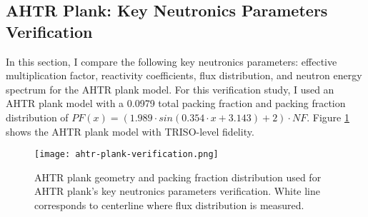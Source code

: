 \subsection{AHTR Plank: Key Neutronics Parameters Verification}
In this section, I compare the following key neutronics parameters: effective 
multiplication factor, reactivity coefficients, flux distribution, and neutron energy 
spectrum for the \gls{AHTR} plank model. 
For this verification study, I used an AHTR plank model with a 0.0979 total packing fraction and 
packing fraction distribution of $PF(x) = \left(1.989\cdot sin(0.354\cdot x + 3.143) + 2\right) \cdot NF$. 
Figure \ref{fig:ahtr-plank-verification} shows the AHTR plank model with TRISO-level 
fidelity.
 \begin{figure}[htbp]
    \centering
    \texttt{[image: ahtr-plank-verification.png]}
    \raggedright
    \caption{\acrfull{AHTR} plank geometry and packing fraction distribution used for 
    \gls{AHTR} plank's key neutronics parameters verification. 
    White line corresponds to centerline where flux distribution is measured. }  
    \label{fig:ahtr-plank-verification}
\end{figure}

